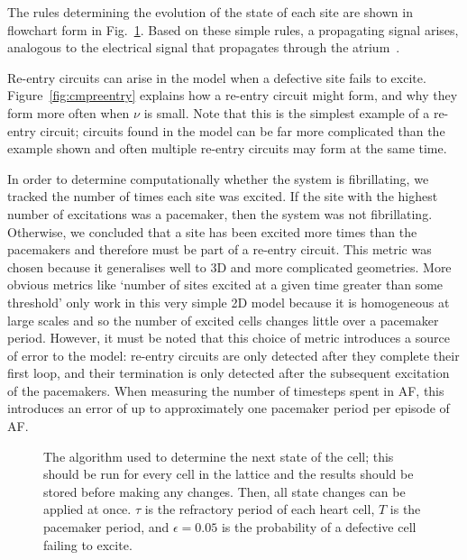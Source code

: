 The rules determining the evolution of the state of each site are shown in flowchart form in Fig.~\ref{fig:cmpalgo}. Based on these simple rules, a propagating signal arises, analogous to the electrical signal that propagates through the atrium~\cite{cmp}.

Re-entry circuits can arise in the model when a defective site fails to excite. Figure~\ref{fig:cmpreentry} explains how a re-entry circuit might form, and why they form more often when $\nu$ is small. Note that this is the simplest example of a re-entry circuit; circuits found in the model can be far more complicated than the example shown and often multiple re-entry circuits may form at the same time.

In order to determine computationally whether the system is fibrillating, we tracked the number of times each site was excited. If the site with the highest number of excitations was a pacemaker, then the system was not fibrillating. Otherwise, we concluded that a site has been excited more times than the pacemakers and therefore must be part of a re-entry circuit. This metric was chosen because it generalises well to 3D and more complicated geometries. More obvious metrics like `number of sites excited at a given time greater than some threshold' only work in this very simple 2D model because it is homogeneous at large scales and so the number of excited cells changes little over a pacemaker period. However, it must be noted that this choice of metric introduces a source of error to the model: re-entry circuits are only detected after they complete their first loop, and their termination is only detected after the subsequent excitation of the pacemakers. When measuring the number of timesteps spent in AF, this introduces an error of up to approximately one pacemaker period per episode of AF. %

\begin{figure}
	\centering
    
    \caption{The algorithm used to determine the next state of the cell; this should be run for every cell in the lattice and the results should be stored before making any changes. Then, all state changes can be applied at once. $\tau$ is the refractory period of each heart cell, $T$ is the pacemaker period, and $\epsilon = 0.05$ is the probability of a defective cell failing to excite.}
    \label{fig:cmpalgo}
\end{figure}

